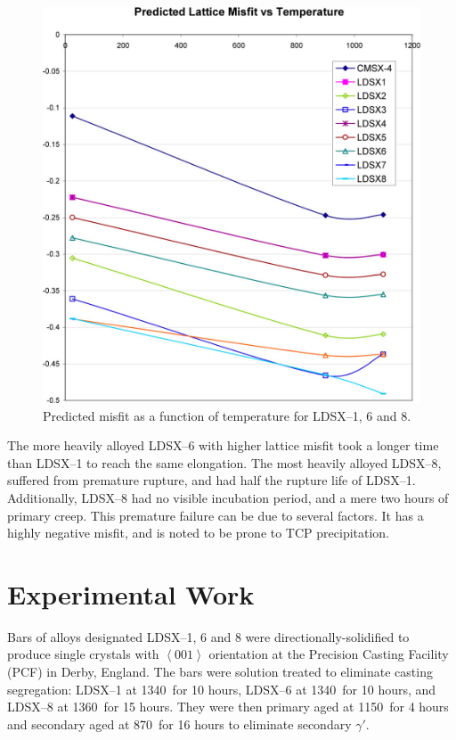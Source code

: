%
\begin{figure}[H]
\begin{center}
\includegraphics{MisfitJMatPro}
\caption{Predicted misfit as a function of temperature for LDSX--1, 6 and 8.}
\label{fig:MisfitJMatPro}
\end{center}
\end{figure}
%
The more heavily alloyed LDSX--6 with higher lattice misfit took a longer time than LDSX--1 to reach the same elongation.  The most heavily alloyed LDSX--8, suffered from premature rupture, and had half the rupture life of LDSX--1.  Additionally, LDSX--8 had no visible incubation period, and a mere two hours of primary creep.  This premature failure can be due to several factors.  It has a highly negative misfit, and is noted to be prone to TCP precipitation. 




\section{Experimental Work}

Bars of alloys designated LDSX--1, 6 and 8 were directionally-solidified to produce single crystals with $\left<001\right>$ orientation at the Precision Casting Facility (PCF) in Derby, England.  The bars were solution treated to eliminate casting segregation: LDSX--1 at 1340\celsius\ for 10 hours, LDSX--6 at 1340\celsius\ for 10 hours, and LDSX--8 at 1360\celsius\ for 15 hours.  They were then primary aged at 1150\celsius\ for 4 hours and secondary aged at 870\celsius\ for 16 hours to eliminate secondary $\gamma'$. 


